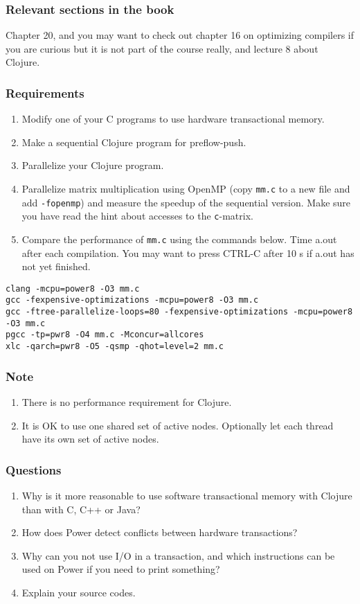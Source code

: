 \documentclass{forsete}
\begin{document}
{\subsubsection*{Relevant sections in the book}
Chapter 20, and you may want to check out chapter 16 on optimizing compilers if you are curious but it is
not part of the course really, and lecture 8 about Clojure.
\subsubsection*{Requirements}
\begin{enumerate}
\item Modify one of your C programs to use hardware transactional memory.
\item Make a sequential Clojure program for preflow-push.
\item Parallelize your Clojure program.
\item Parallelize matrix multiplication using OpenMP (copy \verb!mm.c! to a new file and add \verb.-fopenmp.) 
and measure the speedup of the sequential version.  Make sure you have read the hint about accesses to the \verb.c.-matrix.
\item Compare the performance of \verb!mm.c! using the commands below.
Time a.out after each compilation. You may want to press CTRL-C after 10 s if
a.out has not yet finished.
\end{enumerate}
\begin{verbatim} 
clang -mcpu=power8 -O3 mm.c
gcc -fexpensive-optimizations -mcpu=power8 -O3 mm.c
gcc -ftree-parallelize-loops=80 -fexpensive-optimizations -mcpu=power8 -O3 mm.c
pgcc -tp=pwr8 -O4 mm.c -Mconcur=allcores
xlc -qarch=pwr8 -O5 -qsmp -qhot=level=2 mm.c
\end{verbatim}

\subsubsection*{Note}
\begin{enumerate}
\item There is no performance requirement for Clojure.
\item It is OK to use one shared set of active nodes. Optionally let each thread have
its own set of active nodes.
\end{enumerate}

\subsubsection*{Questions}
\begin{enumerate}
\item Why is it more reasonable to use software transactional memory with
Clojure than with C, C++ or Java?
\item How does Power detect conflicts between hardware transactions?
\item Why can you not use I/O in a transaction, and which instructions can be used on Power if
you need to print something?
\item Explain your source codes.
\end{enumerate}

}
\end{document}
